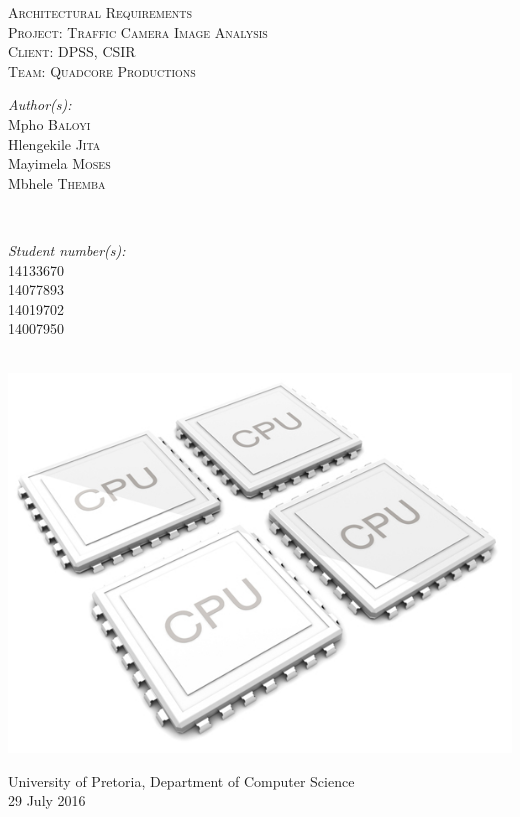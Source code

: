 \documentclass[a4paper,12pt]{article}
\begin{document}
\begin{titlepage}
\center

\textsc{\LARGE Architectural Requirements}\\[1.5cm]
\textsc{\Large Project: Traffic Camera Image Analysis}\\[1.5cm]
\textsc{\large Client: DPSS, CSIR}\\[0.5cm]
\textsc{\large Team: Quadcore Productions}\\[0.5cm]

\begin{minipage}{0.4\textwidth}
\begin{flushleft} \large
\emph{Author(s):}\\
Mpho \textsc{Baloyi}\\
Hlengekile \textsc{Jita}\\
Mayimela \textsc{Moses}\\
Mbhele \textsc{Themba}\\
\end{flushleft}
\end{minipage}
~
\begin{minipage}{0.4\textwidth}
\begin{flushright} \large
\emph{Student number(s):} \\
14133670\\ %
14077893\\
14019702\\
14007950\\
\end{flushright}
\end{minipage}\\

\includegraphics[width=\textwidth]{2012-quad-core-phones.jpg}

{\large University of Pretoria, Department of Computer Science}\\

{\large 29 July 2016}\\[3cm]

\vfil

\end{titlepage}
\end{document}
